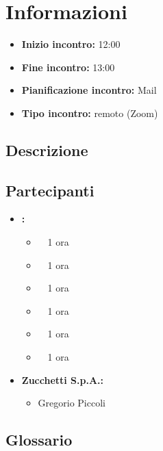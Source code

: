 \section{Informazioni}
\begin{itemize}
	\item \textbf{Inizio incontro:} 12:00
	\item \textbf{Fine incontro:} 13:00
	\item \textbf{Pianificazione incontro:} Mail
	\item \textbf{Tipo incontro:} remoto (Zoom)
\end{itemize}

\subsection{Descrizione}
\DocDescription

\subsection{Partecipanti}

\begin{itemize}
	\item \textbf{\GroupName:}
	\begin{itemize}
		\item \tommaso \ \rightarrow\ 1 ora
		\item \marco \ \rightarrow\ 1 ora
		\item \riccardo \ \rightarrow\ 1 ora
		\item \raul \ \rightarrow\ 1 ora 
		\item \martina \ \rightarrow\ 1 ora 
		\item \sebastiano \ \rightarrow\ 1 ora
	\end{itemize}
	\item \textbf{Zucchetti S.p.A.:}
    \begin{itemize}
        \item Gregorio Piccoli
    \end{itemize}
\end{itemize}

\subsection{Glossario}
\GlossarioIntroduzioneVE

\clearpage